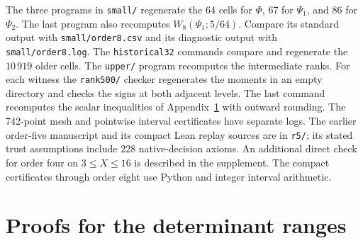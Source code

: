 \documentclass[11pt,a4paper,reqno]{amsart}
\numberwithin{equation}{section}
\begin{document}
The three programs in \texttt{small/} regenerate the 64 cells for \(\Phi\), 67 for \(\Psi_1\), and 86 for \(\Psi_2\). The last program also recomputes \(W_8(\Psi_1;5/64)\). Compare its standard output with \texttt{small/order8.csv} and its diagnostic output with \texttt{small/order8.log}. The \texttt{historical32} commands compare and regenerate the \(10\,919\) older cells. The \texttt{upper/} program recomputes the intermediate ranks. For each witness the \texttt{rank500/} checker regenerates the moments in an empty directory and checks the signs at both adjacent levels. The last command recomputes the scalar inequalities of Appendix~\ref{sec:dproof} with outward rounding. The 742-point mesh and pointwise interval certificates have separate logs. The earlier order-five manuscript and its compact Lean replay sources are in \texttt{r5/}; its stated trust assumptions include 228 native-decision axioms. An additional direct check for order four on \(3\le X\le16\) is described in the supplement. The compact certificates through order eight use Python and integer interval arithmetic.

\section{Proofs for the determinant ranges}\label{sec:dproof}
\end{document}
